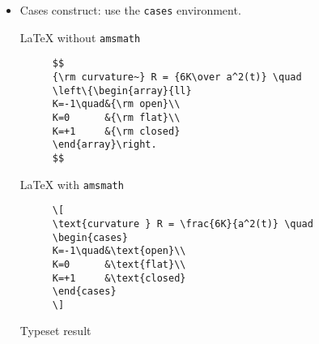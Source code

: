 \documentclass{cernphprep}
\begin{document}
\begin{itemize}
\begin{description}
\item[\TeX{}] \verb!$\bmatrix{a & b \cr c & d\cr}$!
\item[\LaTeX] \verb!$\begin{bmatrix}a & b\\c & d\end{bmatrix}$!%
   \hfill\raisebox{1em}[0mm][0mm]{%
       $\displaystyle\begin{bmatrix}a & b\\c & d\end{bmatrix}$}
\end{description}
\item Cases construct: use the \texttt{cases} environment.
\begin{description}
\item[\LaTeX{} without \texttt{amsmath}] 
\begin{minipage}[t]{.7\linewidth}
\begin{Verbatim}[fontsize=\small]
$$
{\rm curvature~} R = {6K\over a^2(t)} \quad
\left\{\begin{array}{ll}
K=-1\quad&{\rm open}\\
K=0      &{\rm flat}\\
K=+1     &{\rm closed}
\end{array}\right.
$$
\end{Verbatim}
\end{minipage}
\item[\LaTeX{} with \texttt{amsmath}]
\begin{minipage}[t]{.7\linewidth}
\begin{Verbatim}[fontsize=\small]
\[
\text{curvature } R = \frac{6K}{a^2(t)} \quad
\begin{cases}
K=-1\quad&\text{open}\\
K=0      &\text{flat}\\
K=+1     &\text{closed}
\end{cases}
\]
\end{Verbatim}
\end{minipage}
\item[Typeset result] 
\begin{minipage}[t]{.64\linewidth}

\end{minipage}
\end{description}
\end{itemize}
\end{document}
